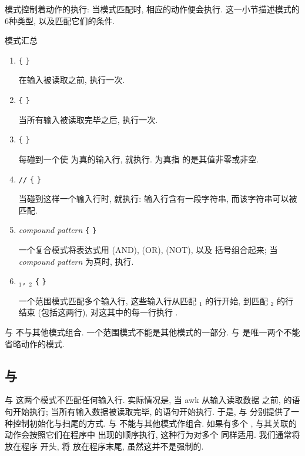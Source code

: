 模式控制着动作的执行: 当模式匹配时, 相应的动作便会执行. 
这一小节描述模式的6种类型, 以及匹配它们的条件.
\begin{summary}{模式汇总}
    \begin{enumerate}
        \item \BEGIN \verb'{' \stmt \verb'}' \par
            在输入被读取之前, \stmt 执行一次.
        \item \END \verb'{' \stmt \verb'}'      \par
            当所有输入被读取完毕之后, \stmt 执行一次.
        \item \expr \verb'{' \stmt \verb'}' \par
            每碰到一个使 \expr 为真的输入行, \stmt 就执行. \expr 为真指
            的是其值非零或非空.
        \item \verb'/'\regexpr\verb'/' \verb'{' \stmt \verb'}' \par
            当碰到这样一个输入行时, \stmt 就执行: 输入行含有一段字符串,
            而该字符串可以被 \regexpr 匹配.
        \item \textit{compound pattern} \verb'{' \stmt \verb'}' \par
            一个复合模式将表达式用 \AND{}(AND), \OR{}(OR), \NOT{}(NOT), 以及
            括号组合起来; 当 \textit{compound pattern} 为真时, \stmt 执行.
        \item \pat$_1$\verb',' \pat$_2$ \verb'{' \stmt{}\verb'}' \par
            一个范围模式匹配多个输入行, 这些输入行从匹配 \pat$_1$ 的行开始,
            到匹配 \pat$_2$ 的行结束 (包括这两行), 对这其中的每一行执行
            \stmt.
    \end{enumerate}
    \BEGIN 与 \END 不与其他模式组合. 一个范围模式不能是其他模式的一部分.
    \BEGIN 与 \END 是唯一两个不能省略动作的模式.
\end{summary}

\subsection{\BEGIN 与 \END}
\label{subsec:the_awk_language_begin_and_end}

\BEGIN 与 \END 这两个模式不匹配任何输入行. 实际情况是, 当 awk 从输入读取数据
之前, \BEGIN 的语句开始执行;
当所有输入数据被读取完毕, \END 的语句开始执行.
于是, \BEGIN 与 \END 分别提供了一种控制初始化与扫尾的方式. \BEGIN 与 \END
不能与其他模式作组合. 如果有多个 \BEGIN, 与其关联的动作会按照它们在程序中
出现的顺序执行, 这种行为对多个 \END 同样适用. 我们通常将 \BEGIN 放在程序
开头, 将 \END 放在程序末尾, 虽然这并不是强制的.


